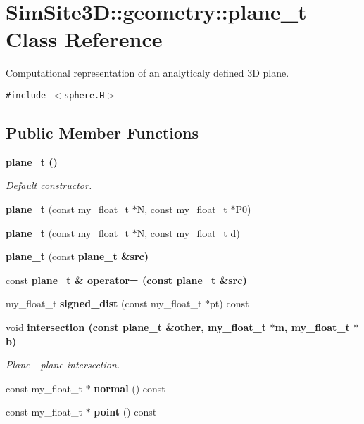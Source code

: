 \section{SimSite3D::geometry::plane\_\-t Class Reference}
\label{classSimSite3D_1_1geometry_1_1plane__t}
Computational representation of an analyticaly defined 3D plane.  


{\tt \#include $<$sphere.H$>$}

\subsection*{Public Member Functions}
\begin{CompactItemize}
\item 
\bf{plane\_\-t} ()\label{classSimSite3D_1_1geometry_1_1plane__t_6a96b14a51383e4f04b440fa4f89ce72}

\begin{CompactList}\small\item\em Default constructor. \item\end{CompactList}\item 
\textbf{plane\_\-t} (const my\_\-float\_\-t $\ast$N, const my\_\-float\_\-t $\ast$P0)\label{classSimSite3D_1_1geometry_1_1plane__t_e9e131b4396c0cfd95ca45fe5e10c7fc}

\item 
\textbf{plane\_\-t} (const my\_\-float\_\-t $\ast$N, const my\_\-float\_\-t d)\label{classSimSite3D_1_1geometry_1_1plane__t_59a4c03593f8738e75c8058bca6ae3b5}

\item 
\textbf{plane\_\-t} (const \bf{plane\_\-t} \&src)\label{classSimSite3D_1_1geometry_1_1plane__t_3bcc78fa427df47158b7a929f5daf4f5}

\item 
const \bf{plane\_\-t} \& \textbf{operator=} (const \bf{plane\_\-t} \&src)\label{classSimSite3D_1_1geometry_1_1plane__t_52998da3f919f0dc7ad81b41ff06a6fa}

\item 
my\_\-float\_\-t \textbf{signed\_\-dist} (const my\_\-float\_\-t $\ast$pt) const \label{classSimSite3D_1_1geometry_1_1plane__t_d07a8d10378c09fa6e685ac904c2646d}

\item 
void \bf{intersection} (const \bf{plane\_\-t} \&other, my\_\-float\_\-t $\ast$m, my\_\-float\_\-t $\ast$b)
\begin{CompactList}\small\item\em Plane - plane intersection. \item\end{CompactList}\item 
const my\_\-float\_\-t $\ast$ \textbf{normal} () const \label{classSimSite3D_1_1geometry_1_1plane__t_46707f1b4f2a00ea36fc49e783d153b9}

\item 
const my\_\-float\_\-t $\ast$ \textbf{point} () const \label{classSimSite3D_1_1geometry_1_1plane__t_85dd05c8e741d2bb84bdf62e00831108}

\end{CompactItemize}
